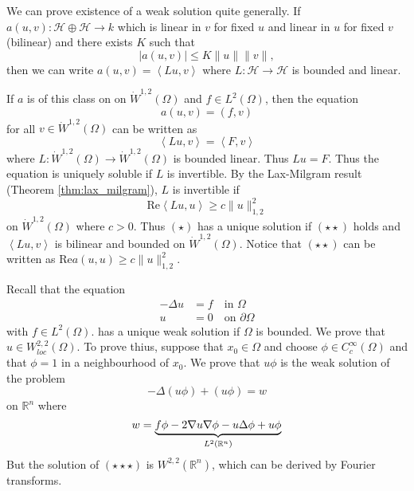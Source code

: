 \documentclass[10pt, oneside, reqno]{amsart}
\theoremstyle{plain}%
\numberwithin{equation}{section}
\theoremstyle{definition}
\theoremstyle{remark}
\newcommand{\R}{\mathbb{R}}
\newcommand{\iprod}[1]{\left\langle #1 \right\rangle}
\renewcommand{\Re}{\text{Re}}
\begin{document}
	We can prove existence of a weak solution quite generally. If $a(u, v): \mathcal H \oplus \mathcal H \rightarrow k$ which is linear in $v$ for fixed $u$ and linear in $u$ for fixed $v$ (bilinear) and there exists $K$ such that \[
		|a(u, v)| \leq K \| u \| \| v \|,
	\] then we can write $a(u, v) = \iprod{Lu, v}$ where $L : \mathcal H \rightarrow \mathcal H$ is bounded and linear.  

	If $a$ is of this class on on $\dot W^{1, 2}(\Omega)$ and $f \in L^2(\Omega)$, then the equation 
	\[ 
		a(u, v) = (f, v)
		\tag{$\star$}
	\] for all $v \in \dot W^{1, 2}(\Omega)$ can be written as \[
		\iprod{Lu, v} = \iprod{F, v}
	\] where $L: \dot W^{1, 2}(\Omega) \rightarrow \dot W^{1, 2}(\Omega)$ is bounded linear.  Thus $Lu = F$.  Thus the equation is uniquely soluble if $L$ is invertible.  By the Lax-Milgram result (Theorem \ref{thm:lax_milgram}), $L$ is invertible if \[
	\Re \iprod{Lu, u} \geq c \| u \|^2_{1, 2}
	\tag{$\star \star$}
	\]
	on $\dot W^{1, 2}(\Omega)$ where $c > 0$.  Thus $(\star)$ has a unique solution if $(\star \star)$ holds and $\iprod{Lu, v}$ is bilinear and bounded on $\dot W^{1, 2}(\Omega)$.  Notice that $(\star \star)$ can be written as $\Re a(u, u) \geq c \| u \|_{1, 2}^2$.  

Recall that the equation \begin{align*}
	-\Delta u &= f \quad \text{in $\Omega$}\\
		u &= 0 \quad \text{on $\partial \Omega$}
\end{align*} with $f \in L^2(\Omega)$.
has a unique weak solution if $\Omega$ is bounded.  We prove that $u \in W^{2, 2}_{loc}(\Omega)$.  To prove thius, suppose that $x_0 \in \Omega$ and choose $\phi \in C^\infty_c(\Omega)$ and that $\phi = 1$ in a neighbourhood of $x_0$.  We prove that $u \phi$ is the weak solution of the problem \[
	- \Delta (u \phi) + (u \phi) = w 
	\tag{$\star \star \star$}
\]  on $\R^n$ where \[
	w = \underbrace{f \phi - 2 \grad u \grad \phi - u \Delta \phi + u \phi}_{L^2(\R^n)}
\]  But the solution of $(\star \star \star)$ is $W^{2,2}(\R^n)$, which can be derived by Fourier transforms.  
\end{document}
